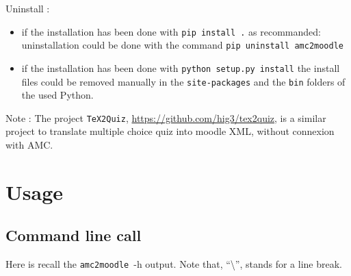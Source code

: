 \documentclass[a4paper]{article}
\newcommand{\amc}{\texttt{amc2moodle}}
\begin{document}
Uninstall :
\begin{itemize}
  \item if the installation has been done with \texttt{pip install .} as recommanded: uninstallation could be done with the command \texttt{pip uninstall amc2moodle}
  \item if the installation has been done with \texttt{python setup.py install} the install files could be removed manually in the \texttt{site-packages} and the \texttt{bin} folders of the used Python.
\end{itemize} 


Note : The project \texttt{TeX2Quiz}, \url{https://github.com/hig3/tex2quiz}, is a similar project to translate multiple choice quiz into moodle XML, without connexion with AMC.


\section{Usage}
\subsection{Command line call}
Here is recall the \amc~-h output. Note that, ``\textbackslash'', stands for a line break.

\end{document}
